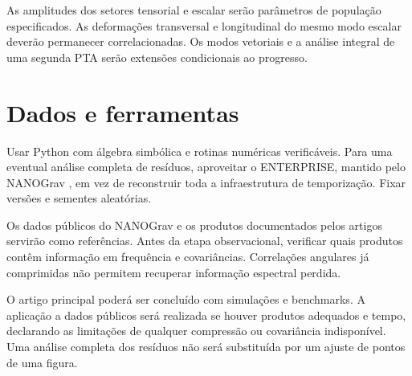 As amplitudes dos setores tensorial e escalar serão parâmetros de
população especificados. As deformações transversal e longitudinal do
mesmo modo escalar deverão permanecer correlacionadas. Os modos
vetoriais e a análise integral de uma segunda PTA serão extensões
condicionais ao progresso.

\clearpage
\section{Dados e ferramentas}\label{dados-e-ferramentas}

Usar Python com álgebra simbólica e rotinas numéricas verificáveis. Para
uma eventual análise completa de resíduos, aproveitar o
ENTERPRISE, mantido pelo NANOGrav \autocite{enterprise}, em vez de reconstruir toda a infraestrutura de
temporização. Fixar versões e sementes aleatórias.

Os dados públicos do NANOGrav \autocite{nanogravdata} e os produtos documentados pelos artigos
servirão como referências. Antes da etapa observacional, verificar quais
produtos contêm informação em frequência e covariâncias. Correlações
angulares já comprimidas não permitem recuperar informação espectral
perdida.

O artigo principal poderá ser concluído com simulações e benchmarks. A
aplicação a dados públicos será realizada se houver produtos adequados e
tempo, declarando as limitações de qualquer compressão ou covariância
indisponível. Uma análise completa dos resíduos não será substituída por
um ajuste de pontos de uma figura.
